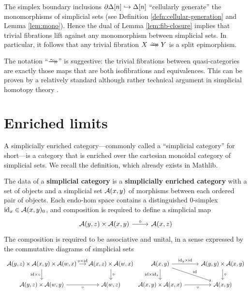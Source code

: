   \begin{rmk}\label{rmk:mono-trivi-fib-lifting} The simplex boundary inclusions $\partial\Delta[n]\hookrightarrow\Delta[n]$ ``cellularly generate'' the monomorphisms of simplicial sets (see Definition \ref{defn:cellular-generation} and Lem\-ma \ref{lem:mono}). Hence the dual of Lemma \ref{lem:fib-closure} implies that trivial fibrations lift against any monomorphism between simplicial sets. In particular, it follows that any trivial fibration $X \trvfib Y$ is a split epimorphism.
  \end{rmk}

  The notation ``$\trvfib$'' is suggestive: the trivial fibrations between quasi-cat\-e\-go\-ries are exactly those maps that are both isofibrations and equivalences. This can be proven by a relatively standard although rather technical argument in simplicial homotopy theory \cite[D.5.6]{RiehlVerity:2022eo}.

\section{Enriched limits}\label{sec:enriched-limits}

A simplicially enriched category---commonly called a ``simplicial category'' for short---is a category that is enriched over the cartesian monoidal category of simplicial sets. We recall the definition, which already exists in Mathlib.

\begin{defn}\label{defn:simplicial-category}
  The data of a \textbf{simplicial category} is a \textbf{simplicially enriched category} with a set of objects and a simplicial set ${\mathord{\mathcal{A}}}(x,y)$ of morphisms between each ordered pair of objects. Each endo-hom space contains a distinguished 0-simplex $\textup{id}_x \in {\mathord{\mathcal{A}}}(x,y)_0$, and composition is required to define a simplicial map
  \[
  \begin{tikzcd}
  \cA(y,z) \times \cA(x,y) \arrow[r, "\circ"] & \cA(x,z)
  \end{tikzcd}
  \] The composition is required to be associative and unital, in a sense expressed by the commutative diagrams of simplicial sets
  \[
  \begin{tikzcd}[column sep=small]
  \cA(y,z) \times \cA(x,y) \times \cA(w,x) \arrow[d, "\id \times \circ"'] \arrow[r, "\circ \times \id"] & \cA(x,z) \times \cA(w,x) \arrow[d, "\circ"]  \\ \cA(y,z) \times \cA(w,y) \arrow[r, "\circ"'] & \cA(w,z)
  \end{tikzcd}
  \begin{tikzcd} \cA(x,y) \arrow[r, "\id_y \times \id"] \arrow[dr, "\id"] \arrow[d, "\id \times \id_x"']  & \cA(y,y) \times \cA(x,y) \arrow[d, "\circ"] \\ \cA(x,y) \times \cA(x,x) \arrow[r, "\circ"'] & \cA(x,y)
  \end{tikzcd}
  \]
\end{defn}

